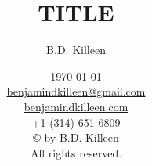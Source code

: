 \usepackage{setspace}
\usepackage{hyperref}
\usepackage{textcomp}
\usepackage{graphicx}
\graphicspath{ {images/} }
\usepackage{float}
\usepackage{chemformula}
\usepackage{xcolor}
\usepackage{titlesec}

\newcommand{\todo}[1]{{\color{red} [TODO: #1]}}

\newcommand{\scene}{
  \begin{center}--- --- ---
\end{center}}

\newcommand{\quickwordcount}[1]{%
  \immediate\write18{texcount -1 -merge -sum -q #1.tex > #1-words.sum}%
}

\hfuzz=5.002pt

\title{TITLE}
\author{B.D. Killeen}
\date{                          %
  \today\\
  \href{mailto:benjamindkilleen@gmail.com}{benjamindkilleen@gmail.com} \\
  \href{https://benjamindkilleen.com}{benjamindkilleen.com} \\
  +1 (314) 651-6809 \\
  \vspace{20em}
  \normalsize
  \copyright{ }\the\year{} by B.D. Killeen\\
  All rights reserved.
}

\usepackage{fancyhdr}
\pagestyle{fancy}
\setlength{\headheight}{14.5pt}




\frontmatter{}
\singlespacing{}
\maketitle

\newpage

\tableofcontents

\mainspacing{}

\mainmatter{}



% 




